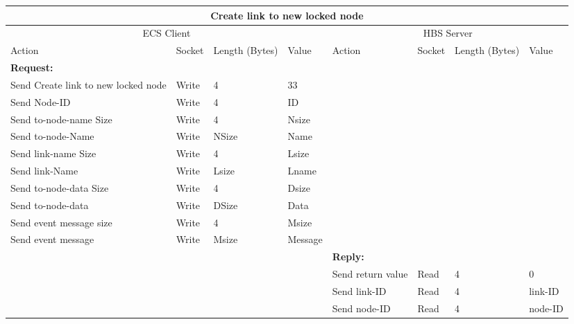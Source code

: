 \bigskip
\small
\begin{tabular}{|p{1.2in}|p{.4in}|p{.4in}|p{.5in}|p{1.2in}|p{.4in}|p{.4in}|p{.5in} |} \hline
\multicolumn{8}{|c|}{{\bf Create link to new locked node}} \\ \hline
\multicolumn{4}{|c|}{ECS Client} & \multicolumn{4}{|c|}{HBS Server} \\ \hline
Action            & Socket & Length  
                            (Bytes)& Value & Action       & Socket & Length 
                                                                    (Bytes)& Value \\ \hline
\multicolumn{4}{|l}{{\bf Request:}}&\multicolumn{4}{|l|}{~} \\ \hline
Send Create link to new locked node   & Write  & 4     & 33     &              &        &       &       \\ \hline
Send Node-ID      & Write  & 4     &  ID &           &        &       &       \\ \hline
Send to-node-name Size    & Write  & 4     &  Nsize &        &        &       &       \\ \hline
Send to-node-Name         & Write  &  NSize &  Name &   &        &       &       \\ \hline
Send link-name Size    & Write  & 4     &  Lsize &        &        &       &       \\ \hline
Send link-Name         & Write  &  Lsize &  Lname &   &        &       &       \\ \hline
Send to-node-data Size    & Write  & 4     &  Dsize &        &        &       &       \\ \hline
Send to-node-data         & Write  &  DSize &  Data &   &        &       &       \\ \hline
Send event
message size      & Write  & 4     &  Msize &         &        &       &       \\ \hline
Send event message
                  & Write  &  Msize  &  Message &     &        &       &       \\ \hline
\multicolumn{4}{|l}{~}&\multicolumn{4}{|l|}{{\bf Reply:}} \\ \hline
                  &        &       &       & Send return
                                             value        & Read   &  4    & 0       \\ \hline
                  &        &       &       & Send link-ID & Read &  4    &  link-ID \\ \hline
                  &        &       &       & Send node-ID    & Read   & 4 &  node-ID \\ \hline

\end{tabular}
